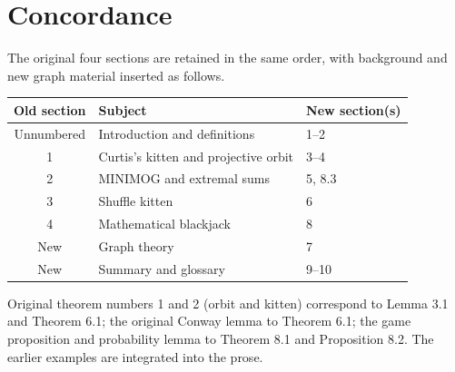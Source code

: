\documentclass[12pt,letterpaper]{article}
\begin{document}
\section{Concordance}
The original four sections are retained in the same order, with background and new graph material inserted as follows.
\begin{center}\begin{tabular}{cll}\toprule
Old section & Subject & New section(s)\\\midrule
Unnumbered & Introduction and definitions & 1--2\\
1 & Curtis's kitten and projective orbit & 3--4\\
2 & MINIMOG and extremal sums & 5, 8.3\\
3 & Shuffle kitten & 6\\
4 & Mathematical blackjack & 8\\
New & Graph theory & 7\\
New & Summary and glossary & 9--10\\\bottomrule\end{tabular}\end{center}
Original theorem numbers 1 and 2 (orbit and kitten) correspond to Lemma 3.1 and Theorem 6.1; the original Conway lemma to Theorem 6.1; the game proposition and probability lemma to Theorem 8.1 and Proposition 8.2. The earlier examples are integrated into the prose.
\end{document}
